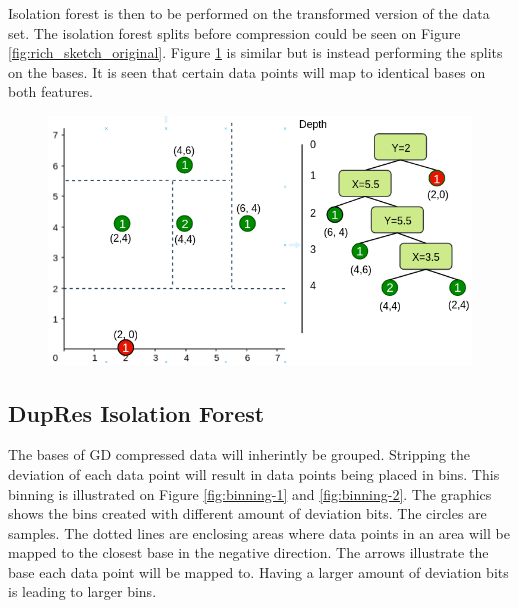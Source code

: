 Isolation forest is then to be performed on the transformed version of the data set. The isolation forest splits before compression could be seen on Figure \ref{fig:rich_sketch_original}. Figure \ref{fig:rich_sketch_bases} is similar but is instead performing the splits on the bases. It is seen that certain data points will map to identical bases on both features.  

\begin{figure}
  \centering
  \includegraphics[width=\linewidth]{images/rich_sketch_bases.png}
  \caption{}
  \label{fig:rich_sketch_bases}
\end{figure}


\subsection{DupRes Isolation Forest}
The bases of GD compressed data will inherintly be grouped. Stripping the deviation of each data point will result in data points being placed in bins. This binning is illustrated on Figure \ref{fig:binning-1} and \ref{fig:binning-2}. The graphics shows the bins created with different amount of deviation bits. The circles are samples. The dotted lines are enclosing areas where data points in an area will be mapped to the closest base in the negative direction. The arrows illustrate the base each data point will be mapped to. Having a larger amount of deviation bits is leading to larger bins. 

